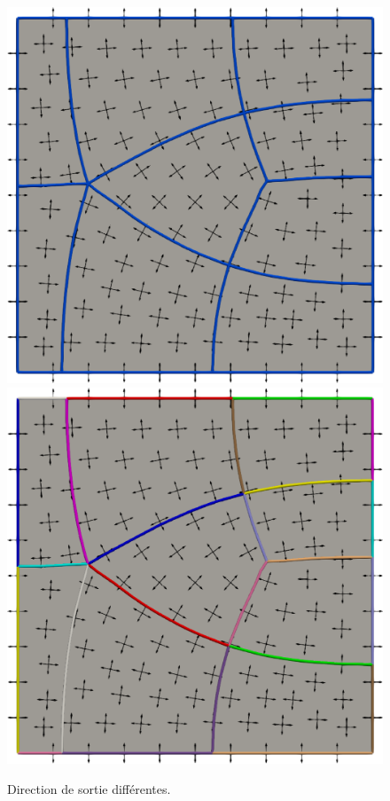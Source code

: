 \begin{figure}[h!]
\centering
\includegraphics[scale=0.2755]{images/eclatement_1.pdf}
\hfill
\includegraphics[scale=0.2755]{images/intersect_stream.pdf}
\caption{Direction de sortie différentes.}
\label{fig:detect_intersection}
\end{figure}


